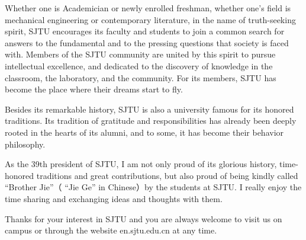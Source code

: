 \begin{bigabstract}
Whether one is Academician or newly enrolled freshman, whether one’s field is mechanical engineering or contemporary literature, in the name of truth-seeking spirit, SJTU encourages its faculty and students to join a common search for answers to the fundamental and to the pressing questions that society is faced with. Members of the SJTU community are united by this spirit to pursue intellectual excellence, and dedicated to the discovery of knowledge in the classroom, the laboratory, and the community. For its members, SJTU has become the place where their dreams start to fly.

Besides its remarkable history, SJTU is also a university famous for its honored traditions. Its tradition of gratitude and responsibilities has already been deeply rooted in the hearts of its alumni, and to some, it has become their behavior philosophy.

As the 39th president of SJTU, I am not only proud of its glorious history, time-honored traditions and great contributions, but also proud of being kindly called “Brother Jie”（ “Jie Ge” in Chinese）by the students at SJTU. I really enjoy the time sharing and exchanging ideas and thoughts with them.

Thanks for your interest in SJTU and you are always welcome to visit us on campus or through the website en.sjtu.edu.cn at any time.

\end{bigabstract}
